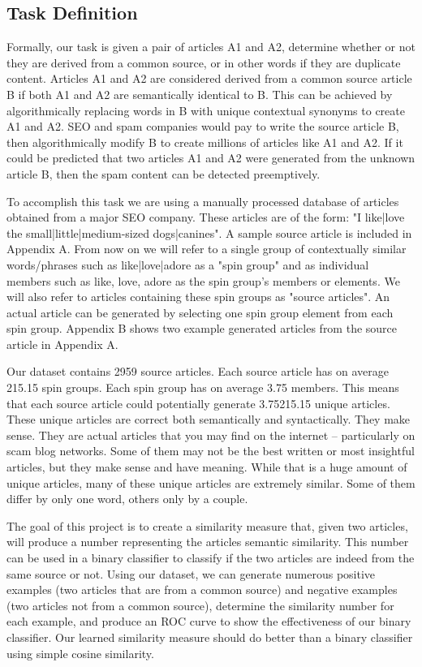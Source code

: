 \documentclass[11pt,letterpaper,oneside, titlepage]{scrartcl}
\begin{document}
\subsection{Task Definition}

Formally, our task is given a pair of articles A1 and A2, determine whether or not they are derived from a common source, or in other words if they are duplicate content. Articles A1 and A2 are considered derived from a common source article B if both A1 and A2 are semantically identical to B. This can be achieved by algorithmically replacing words in B with unique contextual synonyms to create A1 and A2. SEO and spam companies would pay to write the source article B, then algorithmically modify B to create millions of articles like A1 and A2. If it could be predicted that two articles A1 and A2 were generated from the unknown article B, then the spam content can be detected preemptively.

To accomplish this task we are using a manually processed database of articles obtained from a major SEO company. These articles are of the form: "I {like|love} the {small|little|medium-sized} {dogs|canines}". A sample source article is included in Appendix A. From now on we will refer to a single group of contextually similar words/phrases such as {like|love|adore} as a "spin group" and as individual members such as like, love, adore as the spin group's members or elements. We will also refer to articles containing these spin groups as "source articles". An actual article can be generated by selecting one spin group element from each spin group. Appendix B shows two example generated articles from the source article in Appendix A.

Our dataset contains 2959 source articles. Each source article has on average 215.15 spin groups. Each spin group has on average 3.75 members. This means that each source article could potentially generate 3.75215.15 unique articles. These unique articles are correct both semantically and syntactically. They make sense. They are actual articles that you may find on the internet – particularly on scam blog networks. Some of them may not be the best written or most insightful articles, but they make sense and have meaning.  While that is a huge amount of unique articles, many of these unique articles are extremely similar. Some of them differ by only one word, others only by a couple.

The goal of this project is to create a similarity measure that, given two articles, will produce a number representing the articles semantic similarity. This number can be used in a binary classifier to classify if the two articles are indeed from the same source or not. Using our dataset, we can generate numerous positive examples (two articles that are from a common source) and negative examples (two articles not from a common source), determine the similarity number for each example, and produce an ROC curve to show the effectiveness of our binary classifier. Our learned similarity measure should do better than a binary classifier using simple cosine similarity.
\end{document}
